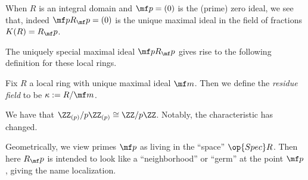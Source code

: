 \documentclass[../notes.tex]{subfiles}
\begin{document}
\begin{example}
	When $R$ is an integral domain and $\mf p=(0)$ is the (prime) zero ideal, we see that, indeed $\mf pR_\mf p=(0)$ is the unique maximal ideal in the field of fractions $K(R)=R_\mf p$.
\end{example}
The uniquely special maximal ideal $\mf pR_\mf p$ gives rise to the following definition for these local rings.
\begin{definition}
	Fix $R$ a local ring with unique maximal ideal $\mf m$. Then we define the \textit{residue field} to be $\kappa:=R/\mf m$.
\end{definition}
\begin{example}
	We have that $\ZZ_{(p)}/p\ZZ_{(p)}\cong\ZZ/p\ZZ$. Notably, the characteristic has changed.
\end{example}
\begin{remark}
	Geometrically, we view primes $\mf p$ as living in the ``space'' $\op{Spec}R$. Then here $R_\mf p$ is intended to look like a ``neighborhood'' or ``germ'' at the point $\mf p$, giving the name localization.
\end{remark}
\end{document}
